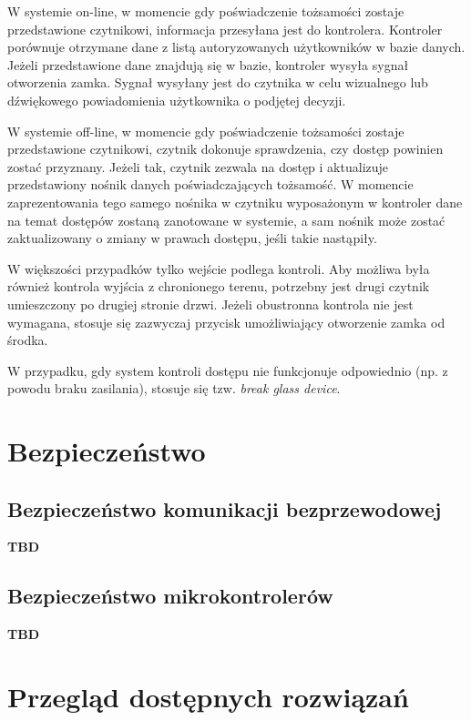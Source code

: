 		W systemie on-line, w momencie gdy poświadczenie tożsamości zostaje przedstawione czytnikowi, informacja przesyłana jest do kontrolera. Kontroler porównuje otrzymane dane z listą autoryzowanych użytkowników w bazie danych. Jeżeli przedstawione dane znajdują się w bazie, kontroler wysyła sygnał otworzenia zamka. Sygnał wysyłany jest do czytnika w celu wizualnego lub dźwiękowego powiadomienia użytkownika o podjętej decyzji.~\cite{bsia2016}

		W systemie off-line, w momencie gdy poświadczenie tożsamości zostaje przedstawione czytnikowi, czytnik dokonuje sprawdzenia, czy dostęp powinien zostać przyznany. Jeżeli tak, czytnik zezwala na dostęp i aktualizuje przedstawiony nośnik danych poświadczających tożsamość. W momencie zaprezentowania tego samego nośnika w czytniku wyposażonym w kontroler dane na temat dostępów zostaną zanotowane w systemie, a sam nośnik może zostać zaktualizowany o zmiany w prawach dostępu, jeśli takie nastąpiły.~\cite{bsia2016}

		W większości przypadków tylko wejście podlega kontroli. Aby możliwa była również kontrola wyjścia z chronionego terenu, potrzebny jest drugi czytnik umieszczony po drugiej stronie drzwi. Jeżeli obustronna kontrola nie jest wymagana, stosuje się zazwyczaj przycisk umożliwiający otworzenie zamka od środka.~\cite{bsia2016}

		W przypadku, gdy system kontroli dostępu nie funkcjonuje odpowiednio (np. z powodu braku zasilania), stosuje się tzw. \textit{break glass device}.~\cite{bsia2016}

	\section{Bezpieczeństwo}

		\subsection{Bezpieczeństwo komunikacji bezprzewodowej}
			\textbf{TBD}

		\subsection{Bezpieczeństwo mikrokontrolerów}
			\textbf{TBD}

	\section{Przegląd dostępnych rozwiązań}

